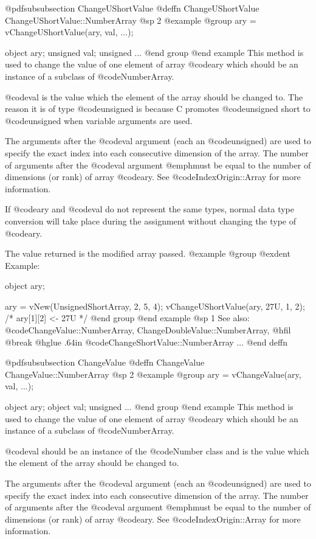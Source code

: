 @pdfsubsubsection {ChangeUShortValue}
@deffn {ChangeUShortValue} ChangeUShortValue::NumberArray
@sp 2
@example
@group
ary = vChangeUShortValue(ary, val, ...);

object    ary;
unsigned  val;
unsigned  ...
@end group
@end example
This method is used to change the value of one element of
array @code{ary} which should be an instance of a subclass of
@code{NumberArray}.

@code{val} is the value which the element of the array should be changed
to.  The reason it is of type @code{unsigned} is because C promotes
@code{unsigned short} to @code{unsigned} when variable arguments are used.

The arguments after the @code{val} argument (each an @code{unsigned})
are used to specify the exact index into each consecutive dimension of
the array.  The number of arguments after the @code{val} argument
@emph{must} be equal to the number of dimensions (or rank) of array
@code{ary}.  See @code{IndexOrigin::Array} for more information.

If @code{ary} and @code{val} do not represent the same types, normal
data type conversion will take place during the assignment without
changing the type of @code{ary}.

The value returned is the modified array passed.
@example
@group
@exdent Example:

object  ary;

ary = vNew(UnsignedShortArray, 2, 5, 4);
vChangeUShortValue(ary, 27U, 1, 2);
/*  ary[1][2] <- 27U  */
@end group
@end example
@sp 1
See also:  @code{ChangeValue::NumberArray, ChangeDoubleValue::NumberArray,}
@hfil @break @hglue .64in @code{ChangeShortValue::NumberArray}  ...
@end deffn








@pdfsubsubsection {ChangeValue}
@deffn {ChangeValue} ChangeValue::NumberArray
@sp 2
@example
@group
ary = vChangeValue(ary, val, ...);

object    ary;
object    val;
unsigned  ...
@end group
@end example
This method is used to change the value of one element of array @code{ary}
which should be an instance of a subclass of @code{NumberArray}.

@code{val} should be an instance of the @code{Number} class and is the
value which the element of the array should be changed to.

The arguments after the @code{val} argument (each an @code{unsigned})
are used to specify the exact index into each consecutive dimension of
the array.  The number of arguments after the @code{val} argument
@emph{must} be equal to the number of dimensions (or rank) of array
@code{ary}.  See @code{IndexOrigin::Array} for more information.


